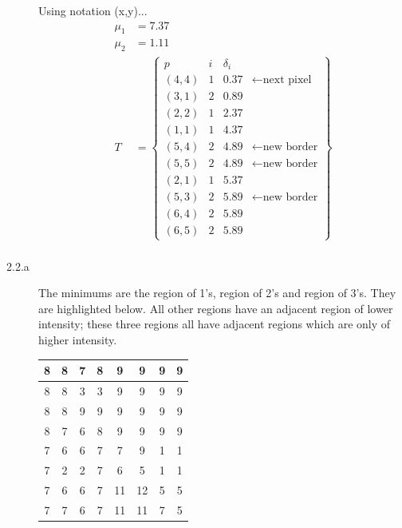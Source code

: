 \documentclass[fleqn]{article}
\begin{document}
\begin{description}
    Using notation (x,y)...
    \begin{align*}
        \mu_1 &= 7.37 \\
        \mu_2 &= 1.11 \\
        T &= \begin{Bmatrix}
                p     & i & \delta_i \\
                (4,4) & 1 & 0.37 & \gets \text{next pixel} \\
                (3,1) & 2 & 0.89 \\
                (2,2) & 1 & 2.37 \\
                (1,1) & 1 & 4.37 \\
                (5,4) & 2 & 4.89 & \gets \text{new border} \\
                (5,5) & 2 & 4.89 & \gets \text{new border} \\
                (2,1) & 1 & 5.37 \\
                (5,3) & 2 & 5.89 & \gets \text{new border} \\
                (6,4) & 2 & 5.89 \\
                (6,5) & 2 & 5.89
            \end{Bmatrix} \\
    \end{align*}

\item [2.2.a]
    The minimums are the region of 1's, region of 2's and region of 3's. They
        are highlighted below. All other regions have an adjacent region of
        lower intensity; these three regions all have adjacent regions which are
        only of higher intensity.

    \begin{tabular}{| c | c | c | c | c | c | c | c |}
        \hline
        8 & 8 & 7 & 8 & 9 & 9 & 9 & 9 \\ \hline
        8 & 8 & \cellcolor{green} 3 & \cellcolor{green} 3 & 9 & 9 & 9 & 9 \\ \hline
        8 & 8 & 9 & 9 & 9 & 9 & 9 & 9 \\ \hline
        8 & 7 & 6 & 8 & 9 & 9 & 9 & 9 \\ \hline
        7 & 6 & 6 & 7 & 7 & 9 & \cellcolor{green} 1 & \cellcolor{green} 1 \\ \hline
        7 & \cellcolor{green} 2 & \cellcolor{green} 2 & 7 & 6 & 5 & \cellcolor{green} 1 & \cellcolor{green} 1 \\ \hline
        7 & 6 & 6 & 7 & 11 & 12 & 5 & 5 \\ \hline
        7 & 7 & 6 & 7 & 11 & 11 & 7 & 5 \\
        \hline
    \end{tabular}


\end{description}
\end{document}
